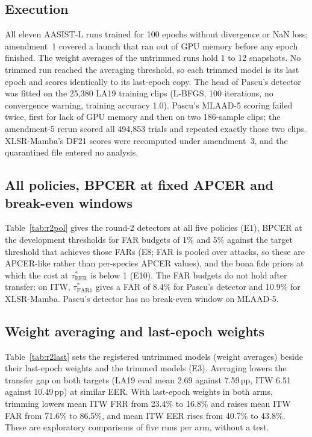 \documentclass[10pt]{article}
\newcommand{\tauE}{\tau^{*}_{\mathrm{EER}}}
\newcommand{\tauA}[1]{\tau^{*}_{\mathrm{FAR}#1}}
\newcommand{\wide}[1]{\begingroup\footnotesize\setlength{\tabcolsep}{3.5pt}\resizebox{\textwidth}{!}{}\endgroup}
\begin{document}
\subsection{Execution}
All eleven AASIST-L runs trained for 100 epochs without divergence or NaN loss; amendment~1 covered a launch that ran out
of GPU memory before any epoch finished. The weight averages of the untrimmed runs hold 1 to 12 snapshots. No trimmed run
reached the averaging threshold, so each trimmed model is its last epoch and scores identically to its last-epoch copy.
The head of Pascu's detector was fitted on the 25,380 LA19 training clips (L-BFGS, 100 iterations, no convergence
warning, training accuracy 1.0). Pascu's MLAAD-5 scoring failed twice, first for lack of GPU memory and then on two
186-sample clips; the amendment-5 rerun scored all 494,853 trials and repeated exactly those two clips. XLSR-Mamba's DF21
scores were recomputed under amendment~3, and the quarantined file entered no analysis.

\subsection{All policies, BPCER at fixed APCER and break-even windows}
Table~\ref{tab:r2pol} gives the round-2 detectors at all five policies (E1), BPCER at the development thresholds for
FAR budgets of 1\% and 5\% against the target threshold that achieves those FARs (E8; FAR is pooled over attacks, so
these are APCER-like rather than per-species APCER values), and the bona fide priors at which the cost at \(\tauE\) is
below 1 (E10). The FAR budgets do not hold after transfer: on ITW, \(\tauA{1}\) gives a FAR of 8.4\% for Pascu's detector
and 10.9\% for XLSR-Mamba. Pascu's detector has no break-even window on MLAAD-5.

\begin{table}[!ht]
\caption{Round-2 detectors: FRR/FAR (\%) at the five frozen policies, BPCER@\(k\) = BPCER at the dev threshold for a
pooled FAR of \(k\)\% / at the target threshold with FAR \(k\)\%, and the break-even window of bona fide priors at \(\tauE\).}
\label{tab:r2pol}
\centering
\wide{r2s_policies}
\end{table}

\subsection{Weight averaging and last-epoch weights}
Table~\ref{tab:r2last} sets the registered untrimmed models (weight averages) beside their last-epoch weights and the
trimmed models (E3). Averaging lowers the transfer gap on both targets (LA19 eval mean 2.69 against 7.59\,pp, ITW 6.51
against 10.49\,pp) at similar EER. With last-epoch weights in both arms, trimming lowers mean ITW FRR from 23.4\% to 16.8\%
and raises mean ITW FAR from 71.6\% to 86.5\%, and mean ITW EER rises from 40.7\% to 43.8\%. These are exploratory
comparisons of five runs per arm, without a test.
\end{document}
